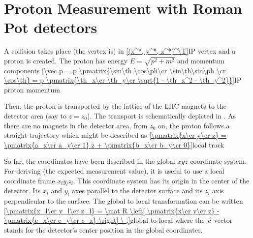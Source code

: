 \iffalse
1200  &     0.514  &    24.140  &   214.6077 &   -0.707 &    0.707 \cr\ln
1201  &    -0.514  &    24.140  &   214.6123 &    0.707 &    0.707 \cr\ln
1202  &     0.514  &    24.140  &   214.6167 &   -0.707 &    0.707 \cr\ln
1203  &    -0.514  &    24.140  &   214.6213 &    0.707 &    0.707 \cr\ln
1204  &     0.514  &    24.140  &   214.6257 &   -0.707 &    0.707 \cr\ln
1205  &    -0.514  &    24.140  &   214.6303 &    0.707 &    0.707 \cr\ln
1206  &     0.514  &    24.140  &   214.6347 &   -0.707 &    0.707 \cr\ln
1207  &    -0.514  &    24.140  &   214.6393 &    0.707 &    0.707 \cr\ln
1208  &     0.514  &    24.140  &   214.6437 &   -0.707 &    0.707 \cr\ln
1209  &    -0.514  &    24.140  &   214.6483 &    0.707 &    0.707 \cr\ln
\fi


\section[rp measurement]{Proton Measurement with Roman Pot detectors}

A collision takes place (the vertex is) in
\eqref{(x^*, y^*, z^*)^\T}{IP vertex}
and a proton is created. The proton has energy $E=\sqrt{p^2 + m^2}$ and momentum components
\eqref{\vec p = p \pmatrix{\sin\th \cos\ph\cr \sin\th\sin\ph \cr \cos\th} = 
p \pmatrix{\th_x\cr \th_y\cr \sqrt{1 - \th_x^2 - \th_y^2}}}{IP proton momentum}


Then, the proton is transported by the lattice of the LHC magnets to the detector area (say to $z = z_0$). The transport is schematically depicted in . As there are no magnets in the detector area, from $z_0$ on, the proton follows a straight trajectory which might be described as
\eqref{\pmatrix{x\cr y\cr z} = \pmatrix{a_x\cr a_y\cr 1} z + \pmatrix{b_x\cr b_y\cr 0}}{local track}

So far, the coordinates have been described in the global $xyz$ coordinate system. For deriving (the expected measurement value), it is useful to use a local coordinate frame $x_l y_l z_l$. This coordinate system has its origin in the center of the detector. Its $x_l$ and $y_l$ axes parallel to the detector surface and its $z_l$ axis perpendicular to the surface. The global to local transformation can be written
\eqref{\pmatrix{x_l\cr y_l\cr z_l} = \mat R \left[ \pmatrix{x\cr y\cr z}  - \pmatrix{c_x\cr c_y\cr c_z}  \right] \ ,}{global to local}
where the $\vec c$ vector stands for the detector's center position in the global coordinates.

